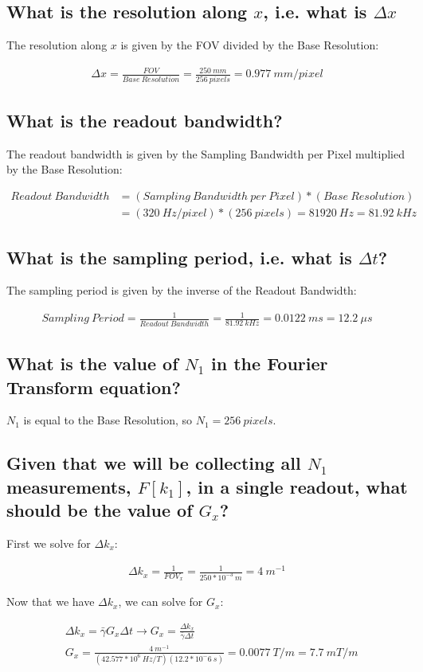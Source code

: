 \documentclass{article}
\begin{document}
\subsection*{What is the resolution along $x$, i.e. what is $\Delta x$}
The resolution along $x$ is given by the FOV divided by the Base Resolution:

\begin{align*}
    \Delta x = \frac{FOV}{Base\ Resolution} = \frac{250\ mm}{256\ pixels} = 0.977\ mm/pixel
\end{align*}

\subsection*{What is the readout bandwidth?}
The readout bandwidth is given by the Sampling Bandwidth per Pixel multiplied by the Base Resolution:

\begin{align*}
    Readout\ Bandwidth &= (Sampling\ Bandwidth\ per\ Pixel) * (Base\ Resolution) \\
    &= (320\ Hz/pixel) * (256\ pixels) = 81920\ Hz = 81.92\ kHz
\end{align*}

\subsection*{What is the sampling period, i.e. what is $\Delta t$?}
The sampling period is given by the inverse of the Readout Bandwidth:

\begin{align*}
    Sampling\ Period = \frac{1}{Readout\ Bandwidth} = \frac{1}{81.92\ kHz} = 0.0122\ ms = 12.2\ \mu s
\end{align*}

\subsection*{What is the value of $N_1$ in the Fourier Transform equation?}
$N_1$ is equal to the Base Resolution, so $N_1 = 256\ pixels$.

\subsection*{Given that we will be collecting all $N_1$ measurements, $F[k_1]$, in a single readout, what should be the value of $G_x$?}
First we solve for $\Delta k_x$:

\begin{align*}
    \Delta k_x = \frac{1}{FOV_x} = \frac{1}{250 * 10^{-3}\ m} = 4\ m^{-1}
\end{align*}

Now that we have $\Delta k_x$, we can solve for $G_x$:

\begin{align*}
    &\Delta k_x = \bar{\gamma} G_x \Delta t \rightarrow G_x = \frac{\Delta k_x}{\bar{\gamma}\Delta t} \\
    &G_x = \frac{4\ m^{-1}}{(42.577 * 10^6\ Hz/T) (12.2 * 10^-6\ s)} = 0.0077\ T/m = 7.7\ mT/m
\end{align*}
\end{document}

